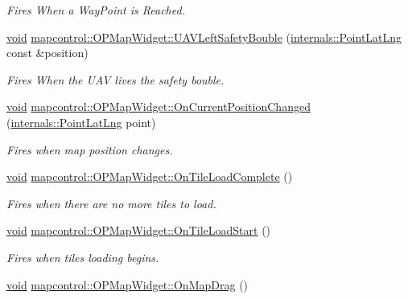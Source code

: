 \begin{DoxyCompactItemize}
\begin{DoxyCompactList}\small\item\em \-Fires \-When a \-Way\-Point is \-Reached. \end{DoxyCompactList}\item 
\hyperlink{group___u_a_v_objects_plugin_ga444cf2ff3f0ecbe028adce838d373f5c}{void} \hyperlink{group___o_p_map_widget_ga77cc2b980ecb442b256f8f494a8835c7}{mapcontrol\-::\-O\-P\-Map\-Widget\-::\-U\-A\-V\-Left\-Safety\-Bouble} (\hyperlink{structinternals_1_1_point_lat_lng}{internals\-::\-Point\-Lat\-Lng} const \&position)
\begin{DoxyCompactList}\small\item\em \-Fires \-When the \-U\-A\-V lives the safety bouble. \end{DoxyCompactList}\item 
\hyperlink{group___u_a_v_objects_plugin_ga444cf2ff3f0ecbe028adce838d373f5c}{void} \hyperlink{group___o_p_map_widget_ga15064d97d2715398719dd78fccb07a39}{mapcontrol\-::\-O\-P\-Map\-Widget\-::\-On\-Current\-Position\-Changed} (\hyperlink{structinternals_1_1_point_lat_lng}{internals\-::\-Point\-Lat\-Lng} point)
\begin{DoxyCompactList}\small\item\em \-Fires when map position changes. \end{DoxyCompactList}\item 
\hyperlink{group___u_a_v_objects_plugin_ga444cf2ff3f0ecbe028adce838d373f5c}{void} \hyperlink{group___o_p_map_widget_ga5cffbc0b6973aa0d25c7a8e3cb9a10bd}{mapcontrol\-::\-O\-P\-Map\-Widget\-::\-On\-Tile\-Load\-Complete} ()
\begin{DoxyCompactList}\small\item\em \-Fires when there are no more tiles to load. \end{DoxyCompactList}\item 
\hyperlink{group___u_a_v_objects_plugin_ga444cf2ff3f0ecbe028adce838d373f5c}{void} \hyperlink{group___o_p_map_widget_gab28c7ce093c06e3dd06d7981fa34abde}{mapcontrol\-::\-O\-P\-Map\-Widget\-::\-On\-Tile\-Load\-Start} ()
\begin{DoxyCompactList}\small\item\em \-Fires when tiles loading begins. \end{DoxyCompactList}\item 
\hyperlink{group___u_a_v_objects_plugin_ga444cf2ff3f0ecbe028adce838d373f5c}{void} \hyperlink{group___o_p_map_widget_ga0985006355718a5c61bfd02c70e6b0aa}{mapcontrol\-::\-O\-P\-Map\-Widget\-::\-On\-Map\-Drag} ()

\end{DoxyCompactItemize}

